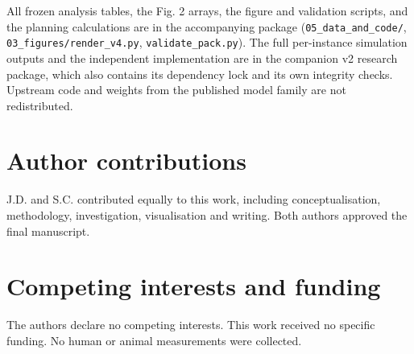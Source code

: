 All frozen analysis tables, the Fig. 2 arrays, the figure and validation scripts, and the planning calculations are in the accompanying package (\texttt{05\_data\_and\_code/}, \texttt{03\_figures/render\_v4.py}, \texttt{validate\_pack.py}). The full per-instance simulation outputs and the independent implementation are in the companion v2 research package, which also contains its dependency lock and its own integrity checks. Upstream code and weights from the published model family are not redistributed.

\section{Author contributions}

J.D. and S.C. contributed equally to this work, including conceptualisation, methodology, investigation, visualisation and writing. Both authors approved the final manuscript.

\section{Competing interests and funding}

The authors declare no competing interests. This work received no specific funding. No human or animal measurements were collected.

